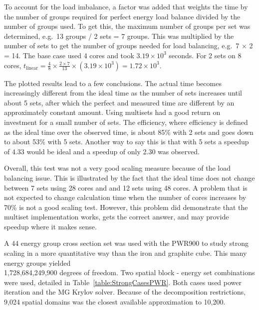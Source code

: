 To account for the load imbalance, a factor was added that weights the time by the number of groups required for perfect energy load balance divided by the number of groups used. To get this, the maximum number of groups per set was determined, e.g.\ 13 groups / 2 sets = 7 groups. This was multiplied by the number of sets to get the number of groups needed for load balancing, e.g.\ 7 $\times$ 2 = 14. The base case used 4 cores and took $3.19 \times 10^{3}$ seconds. For 2 sets on 8 cores, $t_{\text{linear}} = \frac{4}{8}\times\frac{2\times7}{13} \times (3.19 \times 10^{3}) = 1.72 \times 10^{3}$.

The plotted results lead to a few conclusions. The actual time becomes increasingly different from the ideal time as the number of sets increases until about 5 sets, after which the perfect and measured time are different by an approximately constant amount. Using multisets had a good return on investment for a small number of sets. The efficiency, where efficiency is defined as the ideal time over the observed time, is about 85\% with 2 sets and goes down to about 53\% with 5 sets. Another way to say this is that with 5 sets a speedup of 4.33 would be ideal and a speedup of only 2.30 was observed. 

Overall, this test was not a very good scaling measure because of the load balancing issue. This is illustrated by the fact that the ideal time does not change between 7 sets using 28 cores and and 12 sets using 48 cores. A problem that is not expected to change calculation time when the number of cores increases by 70\% is not a good scaling test. However, this problem did demonstrate that the multiset implementation works, gets the correct answer, and may provide speedup where it makes sense.  

A 44 energy group cross section set was used with the PWR900 to study strong scaling in a more quantitative way than the iron and graphite cube. This many energy groups yielded \\ 1,728,684,249,900 degrees of freedom. Two spatial block - energy set combinations were used, detailed in Table~\ref{table:StrongCasesPWR}. Both cases used power iteration and the MG Krylov solver. Because of the decomposition restrictions, 9,024 spatial domains was the closest available approximation to 10,200.

